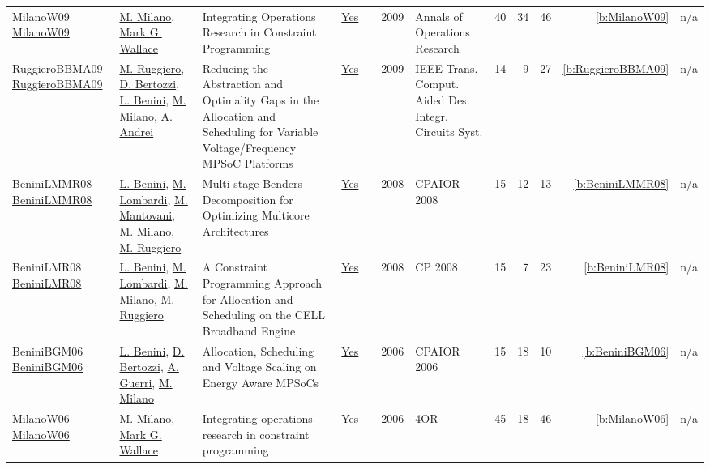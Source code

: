 {\begin{longtable}{>{\raggedright\arraybackslash}p{3cm}>{\raggedright\arraybackslash}p{6cm}>{\raggedright\arraybackslash}p{6.5cm}rrrp{2.5cm}rrrrr}
MilanoW09 \href{http://dx.doi.org/10.1007/s10479-009-0654-9}{MilanoW09} & \hyperref[auth:a144]{M. Milano}, \hyperref[auth:a117]{Mark G. Wallace} & Integrating Operations Research in Constraint Programming & \href{../works/MilanoW09.pdf}{Yes} & \cite{MilanoW09} & 2009 & Annals of Operations Research & 40 & 34 & 46 & \ref{b:MilanoW09} & n/a\\
RuggieroBBMA09 \href{https://doi.org/10.1109/TCAD.2009.2013536}{RuggieroBBMA09} & \hyperref[auth:a724]{M. Ruggiero}, \hyperref[auth:a378]{D. Bertozzi}, \hyperref[auth:a247]{L. Benini}, \hyperref[auth:a144]{M. Milano}, \hyperref[auth:a725]{A. Andrei} & Reducing the Abstraction and Optimality Gaps in the Allocation and Scheduling for Variable Voltage/Frequency MPSoC Platforms & \href{../works/RuggieroBBMA09.pdf}{Yes} & \cite{RuggieroBBMA09} & 2009 & {IEEE} Trans. Comput. Aided Des. Integr. Circuits Syst. & 14 & 9 & 27 & \ref{b:RuggieroBBMA09} & n/a\\
BeniniLMMR08 \href{https://doi.org/10.1007/978-3-540-68155-7_6}{BeniniLMMR08} & \hyperref[auth:a247]{L. Benini}, \hyperref[auth:a143]{M. Lombardi}, \hyperref[auth:a1168]{M. Mantovani}, \hyperref[auth:a144]{M. Milano}, \hyperref[auth:a724]{M. Ruggiero} & Multi-stage Benders Decomposition for Optimizing Multicore Architectures & \href{../works/BeniniLMMR08.pdf}{Yes} & \cite{BeniniLMMR08} & 2008 & CPAIOR 2008 & 15 & 12 & 13 & \ref{b:BeniniLMMR08} & n/a\\
BeniniLMR08 \href{http://dx.doi.org/10.1007/978-3-540-85958-1_2}{BeniniLMR08} & \hyperref[auth:a247]{L. Benini}, \hyperref[auth:a143]{M. Lombardi}, \hyperref[auth:a144]{M. Milano}, \hyperref[auth:a724]{M. Ruggiero} & A Constraint Programming Approach for Allocation and Scheduling on the CELL Broadband Engine & \href{../works/BeniniLMR08.pdf}{Yes} & \cite{BeniniLMR08} & 2008 & CP 2008 & 15 & 7 & 23 & \ref{b:BeniniLMR08} & n/a\\
BeniniBGM06 \href{https://doi.org/10.1007/11757375_6}{BeniniBGM06} & \hyperref[auth:a247]{L. Benini}, \hyperref[auth:a378]{D. Bertozzi}, \hyperref[auth:a379]{A. Guerri}, \hyperref[auth:a144]{M. Milano} & Allocation, Scheduling and Voltage Scaling on Energy Aware MPSoCs & \href{../works/BeniniBGM06.pdf}{Yes} & \cite{BeniniBGM06} & 2006 & CPAIOR 2006 & 15 & 18 & 10 & \ref{b:BeniniBGM06} & n/a\\
MilanoW06 \href{http://dx.doi.org/10.1007/s10288-006-0019-z}{MilanoW06} & \hyperref[auth:a144]{M. Milano}, \hyperref[auth:a117]{Mark G. Wallace} & Integrating operations research in constraint programming & \href{../works/MilanoW06.pdf}{Yes} & \cite{MilanoW06} & 2006 & 4OR & 45 & 18 & 46 & \ref{b:MilanoW06} & n/a\\

\end{longtable}}
